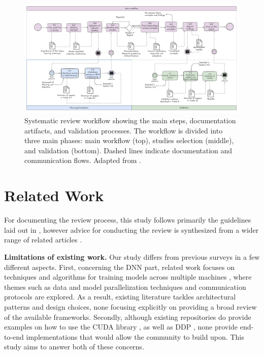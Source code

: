
\begin{figure}[th]
	\centering
	\includegraphics[width=\linewidth]{figures/workflow2}
	\caption{Systematic review workflow showing the main steps, documentation artifacts, and validation processes.
		The workflow is divided into three main phases: main workflow (top), studies selection (middle), and
		validation (bottom). Dashed lines indicate documentation and communication flows. Adapted from \cite{dos_santos_sustainable_2024}.}
	\label{fig:workflow}
\end{figure}

\section{Related Work}
\label{sec:related_work}


For documenting the review process, this study follows primarily the guidelines laid out in
\cite{keele_systematic_2007}, however advice for conducting the review is synthesized from a wider
range of related articles
\cite{brereton_lessons_2007-1,kitchenham_procedures_nodate,budgen_reporting_2018,dos_santos_sustainable_2024}.

\textbf{Limitations of existing work.}
Our study differs from previous surveys in a few different aspects. First, concerning the DNN part,
related work focuses on techniques and algorithms for training models across multiple machines
\cite{dehghani_distributed_2023, chahal_hitchhikers_2018, berloco_systematic_2022}, where themes
such as data and model parallelization techniques and communication protocols are explored. As a
result, existing literature tackles architectural patterns and design choices, none focusing
explicitly on providing a broad review of the available frameworks. Secondly, although existing
repositories do provide examples on how to use the CUDA library
\cite{noauthor_nvidiacuda-samples_2025}, as well as DDP
\cite{noauthor_examplesdistributedddpreadmemd_nodate}, none provide end-to-end implementations that
would allow the community to build upon. This study aims to answer both of these concerns.

